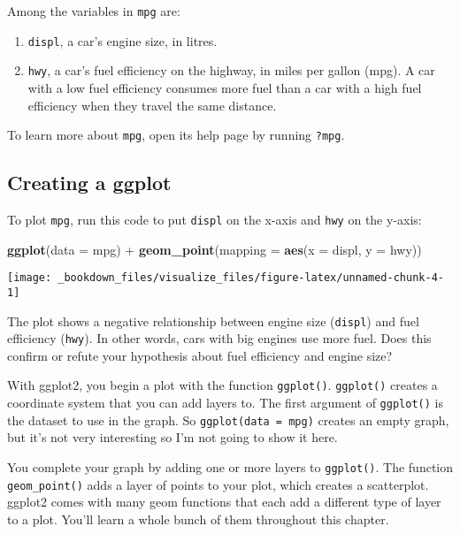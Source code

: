 \documentclass[]{book}
\newenvironment{Shaded}{\begin{snugshade}}{\end{snugshade}}
\newcommand{\KeywordTok}[1]{\textcolor[rgb]{0.13,0.29,0.53}{\textbf{{#1}}}}
\newcommand{\DataTypeTok}[1]{\textcolor[rgb]{0.13,0.29,0.53}{{#1}}}
\newcommand{\StringTok}[1]{\textcolor[rgb]{0.31,0.60,0.02}{{#1}}}
\newcommand{\NormalTok}[1]{{#1}}
\begin{document}
Among the variables in \texttt{mpg} are:

\begin{enumerate}
\def\labelenumi{\arabic{enumi}.}
\item
  \texttt{displ}, a car's engine size, in litres.
\item
  \texttt{hwy}, a car's fuel efficiency on the highway, in miles per
  gallon (mpg). A car with a low fuel efficiency consumes more fuel than
  a car with a high fuel efficiency when they travel the same distance.
\end{enumerate}

To learn more about \texttt{mpg}, open its help page by running
\texttt{?mpg}.

\subsection{Creating a ggplot}\label{creating-a-ggplot}

To plot \texttt{mpg}, run this code to put \texttt{displ} on the x-axis
and \texttt{hwy} on the y-axis:

\begin{Shaded}
\begin{Highlighting}[]
\KeywordTok{ggplot}\NormalTok{(}\DataTypeTok{data =} \NormalTok{mpg) +}\StringTok{ }
\StringTok{  }\KeywordTok{geom_point}\NormalTok{(}\DataTypeTok{mapping =} \KeywordTok{aes}\NormalTok{(}\DataTypeTok{x =} \NormalTok{displ, }\DataTypeTok{y =} \NormalTok{hwy))}
\end{Highlighting}
\end{Shaded}

\begin{center}\texttt{[image: \_bookdown\_files/visualize\_files/figure-latex/unnamed-chunk-4-1]} \end{center}

The plot shows a negative relationship between engine size
(\texttt{displ}) and fuel efficiency (\texttt{hwy}). In other words,
cars with big engines use more fuel. Does this confirm or refute your
hypothesis about fuel efficiency and engine size?

With ggplot2, you begin a plot with the function \texttt{ggplot()}.
\texttt{ggplot()} creates a coordinate system that you can add layers
to. The first argument of \texttt{ggplot()} is the dataset to use in the
graph. So \texttt{ggplot(data\ =\ mpg)} creates an empty graph, but it's
not very interesting so I'm not going to show it here.

You complete your graph by adding one or more layers to
\texttt{ggplot()}. The function \texttt{geom\_point()} adds a layer of
points to your plot, which creates a scatterplot. ggplot2 comes with
many geom functions that each add a different type of layer to a plot.
You'll learn a whole bunch of them throughout this chapter.
\end{document}
